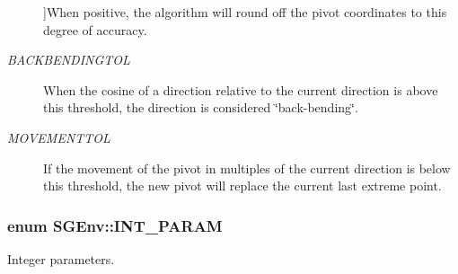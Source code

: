 \begin{Desc}
\begin{description}
{}]When positive, the algorithm will round off the pivot coordinates to this degree of accuracy. \item[{\em 
\hypertarget{classSGEnv_add4d052ff3e3d09a2113e0ebd032eba3a4caeac1b7260cff08fa73b92d9df9865}{B\-A\-C\-K\-B\-E\-N\-D\-I\-N\-G\-T\-O\-L}\label{classSGEnv_add4d052ff3e3d09a2113e0ebd032eba3a4caeac1b7260cff08fa73b92d9df9865}
}]When the cosine of a direction relative to the current direction is above this threshold, the direction is considered \char`\"{}back-\/bending\char`\"{}. \item[{\em 
\hypertarget{classSGEnv_add4d052ff3e3d09a2113e0ebd032eba3a2fa0920a362247d81391c06a8538ff99}{M\-O\-V\-E\-M\-E\-N\-T\-T\-O\-L}\label{classSGEnv_add4d052ff3e3d09a2113e0ebd032eba3a2fa0920a362247d81391c06a8538ff99}
}]If the movement of the pivot in multiples of the current direction is below this threshold, the new pivot will replace the current last extreme point. \end{description}
\end{Desc}
\hypertarget{classSGEnv_ad42a8834fadc101c871bd724ca028fad}{
\subsubsection[{I\-N\-T\-\_\-\-P\-A\-R\-A\-M}]{\setlength{\rightskip}{0pt plus 5cm}enum {\bf S\-G\-Env\-::\-I\-N\-T\-\_\-\-P\-A\-R\-A\-M}}}\label{classSGEnv_ad42a8834fadc101c871bd724ca028fad}


Integer parameters. 

